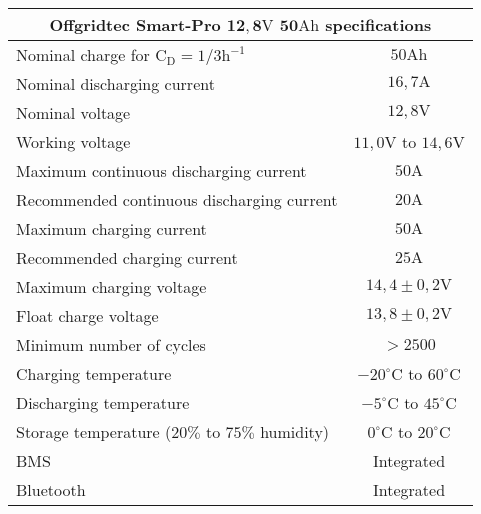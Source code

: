 \footnotesize
\begin{tabular}{|l|c|}
	\hline
	\multicolumn{2}{|c|}{\textbf{Offgridtec Smart-Pro $\boldsymbol{12,8\mathrm{V}}$ $\boldsymbol{50\mathrm{Ah}}$ specifications}} \\
	\hline
	Nominal charge for $\mathrm{C_D} = 1/3\mathrm{h}^{-1}$ & $50\mathrm{Ah}$ \\
	Nominal discharging current & $16,7\mathrm{A}$ \\
	Nominal voltage & $12,8\mathrm{V}$ \\
	Working voltage & $11,0\mathrm{V}$ to $14,6\mathrm{V}$ \\
	Maximum continuous discharging current & $50\mathrm{A}$ \\
	Recommended continuous discharging current & $20\mathrm{A}$ \\
	Maximum charging current & $50\mathrm{A}$ \\
	Recommended charging current & $25\mathrm{A}$ \\
	Maximum charging voltage & $14,4\pm0,2\mathrm{V}$ \\
	Float charge voltage & $13,8\pm0,2\mathrm{V}$ \\
	Minimum number of cycles & $>2500$ \\
	\hline
	Charging temperature & $-20^\circ\mathrm{C}$ to $60^\circ\mathrm{C}$ \\
	Discharging temperature & $-5^\circ\mathrm{C}$ to $45^\circ\mathrm{C}$ \\
	Storage temperature ($20\%$ to $75\%$ humidity) & $0^\circ\mathrm{C}$ to $20^\circ\mathrm{C}$ \\
	\hline
	BMS & Integrated \\
	Bluetooth & Integrated \\
	\hline
\end{tabular}